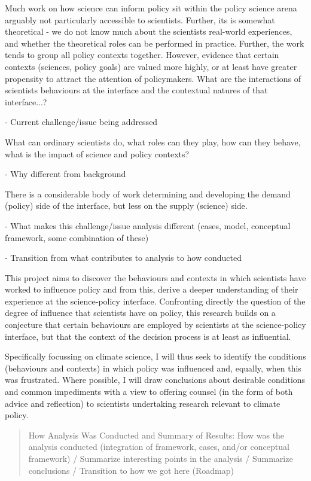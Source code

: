 Much work on how science can inform policy sit within the policy science arena arguably not particularly accessible to scientists. Further, its is somewhat theoretical - we do not know much about the scientists real-world experiences, and whether the theoretical roles can be performed in practice. Further, the work tends to group all policy contexts together. However, evidence that certain contexts (sciences, policy goals) are valued more highly, or at least have greater propensity to attract the attention of policymakers. What are the interactions of scientists behaviours at the interface and the contextual natures of that interface...? 

- Current challenge/issue being addressed

What can ordinary scientists do, what roles can they play, how can they behave, what is the impact of science and policy contexts?

- Why different from background

There is a considerable body of work determining and developing the demand (policy) side of the interface, but less on the supply (science) side.

- What makes this challenge/issue analysis different (cases, model, conceptual framework, some combination of these)

- Transition from what contributes to analysis to how conducted

This project aims to discover the behaviours and contexts in which scientists have worked to influence policy and from this, derive a deeper understanding of their experience at the science-policy interface. Confronting directly the question of the degree of influence that scientists have on policy, this research builds on a conjecture that certain behaviours are employed by scientists at the science-policy interface, but that the context of the decision process is at least as influential. 

Specifically focussing on climate science, I will thus seek to identify the conditions (behaviours and contexts) in which policy was influenced and, equally, when this was frustrated. Where possible, I will draw conclusions about desirable conditions and common impediments with a view to offering counsel (in the form of both advice and reflection) to scientists undertaking research relevant to climate policy. 

\begin{quote}
How Analysis Was Conducted and Summary of Results: How was the analysis conducted (integration of framework, cases, and/or conceptual framework) / Summarize interesting points in the analysis / Summarize conclusions / Transition to how we got here (Roadmap)
\end{quote}


